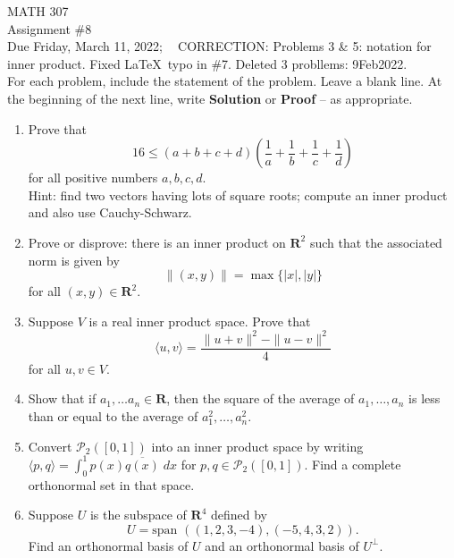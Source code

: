 \documentclass[12pt]{article}
\begin{document}
\noindent MATH 307 \\
Assignment \#8 \\  %
Due Friday, March 11, 2022; $\;\;$ CORRECTION: Problems 3 \& 5:  notation for inner product.  Fixed \LaTeX\ typo in \#7.  Deleted 3 probllems: 9Feb2022.\\

For each problem, include the statement of the problem. Leave a blank line.  At the beginning of the next line, write \textbf{Solution} or \textbf{Proof} -- as appropriate.

\begin{enumerate}
\item Prove that
    \[
        16 \le (a+b+c+d)\left(\frac{1}{a} + \frac{1}{b} + \frac{1}{c} + \frac{1}{d} \right)
    \]
    for all positive numbers $a,b,c,d$.\\
    Hint: find two vectors having lots of square roots; compute an inner product and also use Cauchy-Schwarz.

\item Prove or disprove: there is an inner product on $\mathbf{R}^2$ such that the associated norm is given by
    \[
        \|(x,y)\| = \max \{ |x|, |y| \}
    \]
    for all $(x,y) \in \mathbf{R}^2$.

\item Suppose $V$ is a real inner product space.  Prove that
    \[
        \langle u,v \rangle = \frac{\|u+v \|^2 - \|u-v \|^2}{4}
    \]
    for all $u,v \in V$.

\item Show that if $a_1, \ldots a_n \in \mathbf{R}$, then the square of the average of $a_1, \ldots , a_n$ is less than or equal to the average of $a_1^2, \ldots , a_n^2$.

\item Convert $\mathcal{P}_2([0,1])$ into an inner product space by writing $\langle p,q \rangle = \int_0^1 p(x)\overline{q(x)} \; dx$ for $p,q \in \mathcal{P}_2([0,1])$. Find a complete orthonormal set in that space.

\item Suppose $U$ is the subspace of $\mathbf{R}^4$ defined by
    \[
        U = \text{span }((1,2,3,-4), (-5,4,3,2)).
    \]
    Find an orthonormal basis of $U$ and an orthonormal basis of $U^\perp$.


\end{enumerate}
\end{document}
